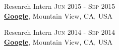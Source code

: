 \documentclass[letterpaper,10pt]{article} %
\begin{document}
{{%

Research Intern \hfill{\textsc{Jun 2015 - Sep 2015}}\\
\href{http://www.google.com}{\textbf{Google}}, Mountain View, CA, USA


Research Intern \hfill{\textsc{Jun 2014 - Sep 2014}}\\
\href{http://www.google.com}{\textbf{Google}}, Mountain View, CA, USA


}}
\end{document}
